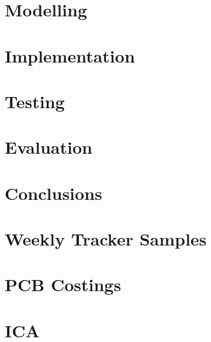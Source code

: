 \documentclass[a4paper, 12pt]{report}
\begin{document}
\chapter{Modelling}



\chapter{Implementation}





\chapter{Testing}





\chapter{Evaluation}

\chapter{Conclusions}




\appendix
\chapter{Weekly Tracker Samples}

\chapter{PCB Costings}

\chapter{ICA}

\end{document}
